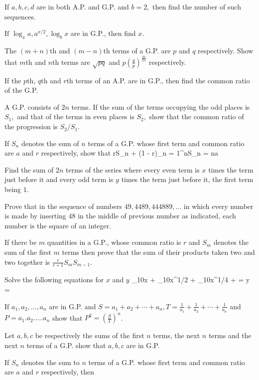 \item If $a, b, c, d$ are in both A.P. and G.P. and $b = 2,$ then find the number of such sequences.
\item If $\log_x a, a^{x/2}, \log_b x$ are in G.P., then find $x.$
\item The $(m + n)$th and $(m - n)$th terms of a G.P. are $p$ and $q$ respectively. Show that $m$th and $n$th terms are
  $\sqrt{pq}$ and $p\left(\frac{q}{p}\right)^{\tfrac{m}{2n}}$ respectively.
\item If the $p$th, $q$th and $r$th terms of an A.P. are in G.P., then find the common ratio of the G.P.
\item A G.P. consists of $2n$ terms. If the sum of the terms occupying the odd places is $S_1,$ and that of the terms in
  even places is $S_2,$ show that the common ratio of the progression is $S_2/S_1$.
\item If $S_n$ denotes the sum of $n$ terms of a G.P. whose first term and common ratio are $a$ and $r$ respectively, show
  that \startformula rS_n + (1 - r)\sum_{n = 1}^nS_n = na\stopformula
\item Find the sum of $2n$ terms of the series where every even term is $x$ times the term just before it and every odd
  term is $y$ times the term just before it, the first term being $1$.
\item Prove that in the sequence of numbers $49, 4489, 444889, \ldots$ in which every number is made by inserting $48$ in
  the middle of previous number as indicated, each number is the square of an integer.
\item If there be $m$ quantities in a G.P., whose common ratio is $r$ and $S_m$ denotes the sum of the first $m$ terms
  then prove that the sum of their products taken two and two together is $\frac{r}{r + 1}S_mS_{m - 1}$.
\item Solve the following equations for $x$ and $y$
  \startformula \log_{10}x + \log_{10}x^{1/2} + \log_{10}x^{1/4} + \cdots = y\stopformula
  \startformula {} = \stopformula
\item If $a_1, a_2, \ldots, a_n$ are in G.P. and $S = a_1 + a_2 + \cdots + a_n, T = \frac{1}{a_1} + \frac{1}{a_2} + \cdots
  + \frac{1}{a_n}$ and $P = a_1.a_2.\ldots.a_n$ show that $P^2 = \left(\frac{S}{T}\right)^n$.
\item Let $a, b, c$ be respectively the sums of the first $n$ terms, the next $n$ terms and the next $n$ terms of a
  G.P. show that $a, b, c$ are in G.P.
\item If $S_n$ denotes the sum to $n$ terms of a G.P. whose first term and common ratio are $a$ and $r$ respectively, then
